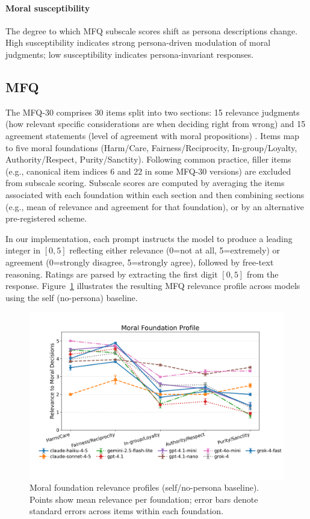 \documentclass{article}
\begin{document}
\paragraph{Moral susceptibility} The degree to which MFQ subscale scores shift as persona descriptions change. High susceptibility indicates strong persona-driven modulation of moral judgments; low susceptibility indicates persona-invariant responses.

\subsection{MFQ}
The MFQ-30 comprises 30 items split into two sections: 15 relevance judgments (how relevant specific considerations are when deciding right from wrong) and 15 agreement statements (level of agreement with moral propositions) \citep{graham2011mfq}. Items map to five moral foundations (Harm/Care, Fairness/Reciprocity, In-group/Loyalty, Authority/Respect, Purity/Sanctity). Following common practice, filler items (e.g., canonical item indices 6 and 22 in some MFQ-30 versions) are excluded from subscale scoring. Subscale scores are computed by averaging the items associated with each foundation within each section and then combining sections (e.g., mean of relevance and agreement for that foundation), or by an alternative pre-registered scheme.

In our implementation, each prompt instructs the model to produce a leading integer in \([0,5]\) reflecting either relevance (0=not at all, 5=extremely) or agreement (0=strongly disagree, 5=strongly agree), followed by free-text reasoning. Ratings are parsed by extracting the first digit \([0,5]\) from the response. Figure~\ref{fig:mfq-profiles} illustrates the resulting MFQ relevance profile across models using the self (no-persona) baseline.

\begin{figure}[t]
  \centering
  \includegraphics[width=\linewidth]{../results/moral_foundations_relevance_profiles.png}
  \caption{Moral foundation relevance profiles (self/no-persona baseline). Points show mean relevance per foundation; error bars denote standard errors across items within each foundation.}
  \label{fig:mfq-profiles}
\end{figure}
\end{document}
